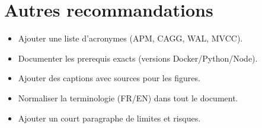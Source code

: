 \section{Autres recommandations}
\begin{itemize}
    \item Ajouter une liste d'acronymes (APM, CAGG, WAL, MVCC).
    \item Documenter les prerequis exacts (versions Docker/Python/Node).
    \item Ajouter des captions avec sources pour les figures.
    \item Normaliser la terminologie (FR/EN) dans tout le document.
    \item Ajouter un court paragraphe de limites et risques.
\end{itemize}
